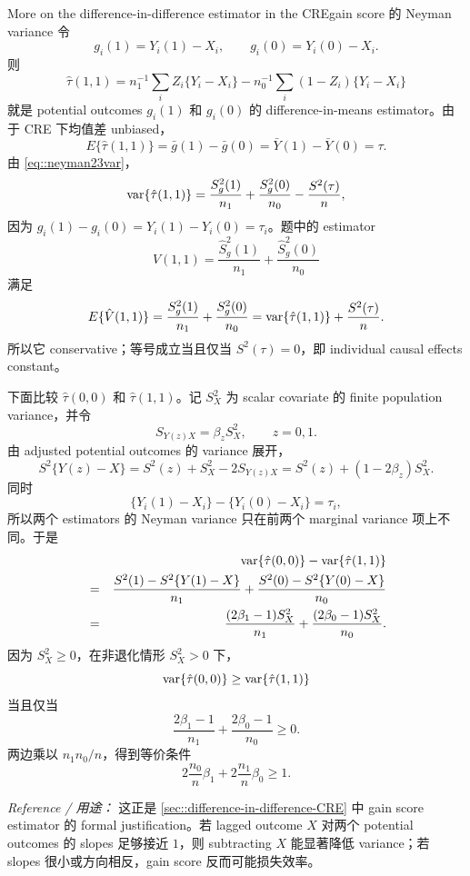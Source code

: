 \begin{exercisesolution}{More on the difference-in-difference estimator in the CRE}{gain score 的 Neyman variance}
令
\[
g_i(1)=Y_i(1)-X_i,\qquad g_i(0)=Y_i(0)-X_i.
\]
则
\[
\hat\tau(1,1)
=n_1^{-1}\sum_iZ_i\{Y_i-X_i\}
-n_0^{-1}\sum_i(1-Z_i)\{Y_i-X_i\}
\]
就是 potential outcomes $g_i(1)$ 和 $g_i(0)$ 的 difference-in-means estimator。由于 CRE 下均值差 unbiased，
\[
E\{\hat\tau(1,1)\}
=\bar g(1)-\bar g(0)
=\bar Y(1)-\bar Y(0)
=\tau.
\]
由 \cref{eq::neyman23var}，
\[
\textup{var}\{\hat\tau(1,1)\}
=\frac{S_g^2(1)}{n_1}+\frac{S_g^2(0)}{n_0}
-\frac{S^2(\tau)}{n},
\]
因为 $g_i(1)-g_i(0)=Y_i(1)-Y_i(0)=\tau_i$。题中的 estimator
\[
\hat V(1,1)
=\frac{\hat S_g^2(1)}{n_1}+\frac{\hat S_g^2(0)}{n_0}
\]
满足
\[
E\{\hat V(1,1)\}
=\frac{S_g^2(1)}{n_1}+\frac{S_g^2(0)}{n_0}
=\textup{var}\{\hat\tau(1,1)\}+\frac{S^2(\tau)}{n}.
\]
所以它 conservative；等号成立当且仅当 $S^2(\tau)=0$，即 individual causal effects constant。

下面比较 $\hat\tau(0,0)$ 和 $\hat\tau(1,1)$。记 $S_X^2$ 为 scalar covariate 的 finite population variance，并令
\[
S_{Y(z)X}=\beta_zS_X^2,\qquad z=0,1.
\]
由 adjusted potential outcomes 的 variance 展开，
\[
S^2\{Y(z)-X\}=S^2(z)+S_X^2-2S_{Y(z)X}
=S^2(z)+(1-2\beta_z)S_X^2.
\]
同时
\[
\{Y_i(1)-X_i\}-\{Y_i(0)-X_i\}=\tau_i,
\]
所以两个 estimators 的 Neyman variance 只在前两个 marginal variance 项上不同。于是
\begin{eqnarray*}
&&\textup{var}\{\hat\tau(0,0)\}-\textup{var}\{\hat\tau(1,1)\}\\
&=&
\frac{S^2(1)-S^2\{Y(1)-X\}}{n_1}
+\frac{S^2(0)-S^2\{Y(0)-X\}}{n_0}\\
&=&
\frac{(2\beta_1-1)S_X^2}{n_1}
+\frac{(2\beta_0-1)S_X^2}{n_0}.
\end{eqnarray*}
因为 $S_X^2\geq0$，在非退化情形 $S_X^2>0$ 下，
\[
\textup{var}\{\hat\tau(0,0)\}\geq\textup{var}\{\hat\tau(1,1)\}
\]
当且仅当
\[
\frac{2\beta_1-1}{n_1}+\frac{2\beta_0-1}{n_0}\geq0.
\]
两边乘以 $n_1n_0/n$，得到等价条件
\[
2\frac{n_0}{n}\beta_1+2\frac{n_1}{n}\beta_0\geq1.
\]

\emph{Reference / 用途：} 这正是 \cref{sec::difference-in-difference-CRE} 中 gain score estimator 的 formal justification。若 lagged outcome $X$ 对两个 potential outcomes 的 slopes 足够接近 $1$，则 subtracting $X$ 能显著降低 variance；若 slopes 很小或方向相反，gain score 反而可能损失效率。
\end{exercisesolution}

